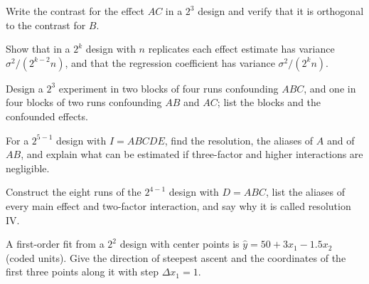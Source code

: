 \begin{exercise}
Write the contrast for the effect $AC$ in a $2^3$ design and verify that it is orthogonal to the contrast for $B$.
\end{exercise}

\begin{exercise}
Show that in a $2^k$ design with $n$ replicates each effect estimate has variance $\sigma^2/(2^{k-2}n)$, and that the regression coefficient has variance $\sigma^2/(2^kn)$.
\end{exercise}

\begin{exercise}
Design a $2^3$ experiment in two blocks of four runs confounding $ABC$, and one in four blocks of two runs confounding $AB$ and $AC$; list the blocks and the confounded effects.
\end{exercise}

\begin{exercise}
For a $2^{5-1}$ design with $I=ABCDE$, find the resolution, the aliases of $A$ and of $AB$, and explain what can be estimated if three-factor and higher interactions are negligible.
\end{exercise}

\begin{exercise}
Construct the eight runs of the $2^{4-1}$ design with $D=ABC$, list the aliases of every main effect and two-factor interaction, and say why it is called resolution IV.
\end{exercise}

\begin{exercise}
A first-order fit from a $2^2$ design with center points is $\hat{y}=50+3x_1-1.5x_2$ (coded units). Give the direction of steepest ascent and the coordinates of the first three points along it with step $\Delta x_1=1$.
\end{exercise}
